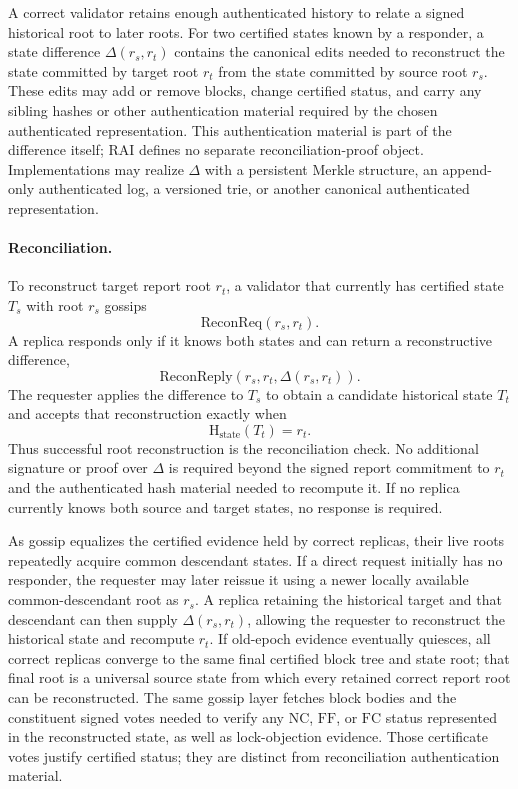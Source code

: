 \documentclass[10pt,twocolumn]{article}
\newcommand{\NC}{\mathrm{NC}}
\newcommand{\FC}{\mathrm{FC}}
\newcommand{\FF}{\mathrm{FF}}
\newcommand{\StateHash}{\mathrm{H}_{\mathrm{state}}}
\newcommand{\ReconReq}{\mathrm{ReconReq}}
\newcommand{\ReconReply}{\mathrm{ReconReply}}
\begin{document}
A correct validator retains enough authenticated history to relate a signed historical root to later roots. For two certified states known by a responder, a state difference $\Delta(r_s,r_t)$ contains the canonical edits needed to reconstruct the state committed by target root $r_t$ from the state committed by source root $r_s$. These edits may add or remove blocks, change certified status, and carry any sibling hashes or other authentication material required by the chosen authenticated representation. This authentication material is part of the difference itself; RAI defines no separate reconciliation-proof object. Implementations may realize $\Delta$ with a persistent Merkle structure, an append-only authenticated log, a versioned trie, or another canonical authenticated representation.

\paragraph{Reconciliation.} To reconstruct target report root $r_t$, a validator that currently has certified state $T_s$ with root $r_s$ gossips
\begin{equation}
\ReconReq(r_s,r_t).
\end{equation}
A replica responds only if it knows both states and can return a reconstructive difference,
\begin{equation}
\ReconReply(r_s,r_t,\Delta(r_s,r_t)).
\end{equation}
The requester applies the difference to $T_s$ to obtain a candidate historical state $T_t$ and accepts that reconstruction exactly when
\begin{equation}
\StateHash(T_t)=r_t.
\end{equation}
Thus successful root reconstruction is the reconciliation check. No additional signature or proof over $\Delta$ is required beyond the signed report commitment to $r_t$ and the authenticated hash material needed to recompute it. If no replica currently knows both source and target states, no response is required.

As gossip equalizes the certified evidence held by correct replicas, their live roots repeatedly acquire common descendant states. If a direct request initially has no responder, the requester may later reissue it using a newer locally available common-descendant root as $r_s$. A replica retaining the historical target and that descendant can then supply $\Delta(r_s,r_t)$, allowing the requester to reconstruct the historical state and recompute $r_t$. If old-epoch evidence eventually quiesces, all correct replicas converge to the same final certified block tree and state root; that final root is a universal source state from which every retained correct report root can be reconstructed. The same gossip layer fetches block bodies and the constituent signed votes needed to verify any $\NC$, $\FF$, or $\FC$ status represented in the reconstructed state, as well as lock-objection evidence. Those certificate votes justify certified status; they are distinct from reconciliation authentication material.
\end{document}
